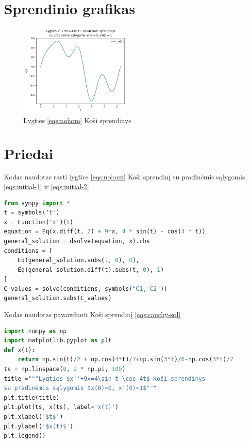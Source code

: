 \documentclass[11pt]{article}
\begin{document}
\section{Sprendinio grafikas}
\begin{figure}[h!]
\centering
\includegraphics[width=0.5\textwidth]{graph.png}
\caption{Lygties \eqref{eqs:nohom} Koši sprendinys}
\label{fig:cauchy-sol}
\end{figure}
\section{Priedai}
Kodas naudotas rasti lygties \eqref{eqs:nohom} Koši sprendinį su pradinėmis sąlygomis \eqref{eqs:initial-1} ir \eqref{eqs:initial-2}
\begin{lstlisting}[language=Python]
from sympy import *
t = symbols('t')
x = Function('x')(t)
equation = Eq(x.diff(t, 2) + 9*x, 4 * sin(t) - cos(4 * t))
general_solution = dsolve(equation, x).rhs
conditions = [
    Eq(general_solution.subs(t, 0), 0),
    Eq(general_solution.diff(t).subs(t, 0), 1)
]
C_values = solve(conditions, symbols("C1, C2"))
general_solution.subs(C_values)
\end{lstlisting}
Kodas naudotas pavaizduoti Koši sprendinį \eqref{eqs:cauchy-sol}
\begin{lstlisting}[language=Python]
import numpy as np
import matplotlib.pyplot as plt
def x(t):
    return np.sin(t)/2 + np.cos(4*t)/7+np.sin(3*t)/6-np.cos(3*t)/7
ts = np.linspace(0, 2 * np.pi, 100)
title ="""Lygties $x''+9x=4\sin t-\cos 4t$ Koši sprendinys
su pradinėmis sąlygomis $x(0)=0, x'(0)=1$"""
plt.title(title)
plt.plot(ts, x(ts), label='x(t)')
plt.xlabel('$t$')
plt.ylabel('$x(t)$')
plt.legend()
\end{lstlisting}
\end{document}
